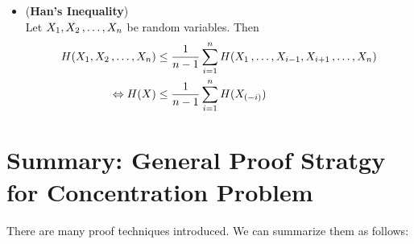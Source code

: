 \documentclass[11pt]{article}
\begin{document}
\begin{itemize}
\item \begin{proposition} (\textbf{Han's Inequality}) \citep{thomas2006elements, boucheron2013concentration}\\
Let $X_1, X_2 \,{,}\ldots{,}\, X_n$ be random variables. Then
\begin{align}
H(X_1, X_2 \,{,}\ldots{,}\, X_n) &\le \frac{1}{n-1}\sum_{i=1}^{n}H(X_1 \,{,}\ldots{,}\, X_{i-1}, X_{i+1} \,{,}\ldots{,}\, X_n) \label{ineqn: han_inequality} \\
\Leftrightarrow H(X) &\le \frac{1}{n-1}\sum_{i=1}^{n}H(X_{(-i)}) \nonumber
\end{align}
\end{proposition}
\end{itemize}

\newpage
\section{Summary: General Proof Stratgy for Concentration Problem}
There are many proof techniques introduced. We can summarize them as follows:
\end{document}
